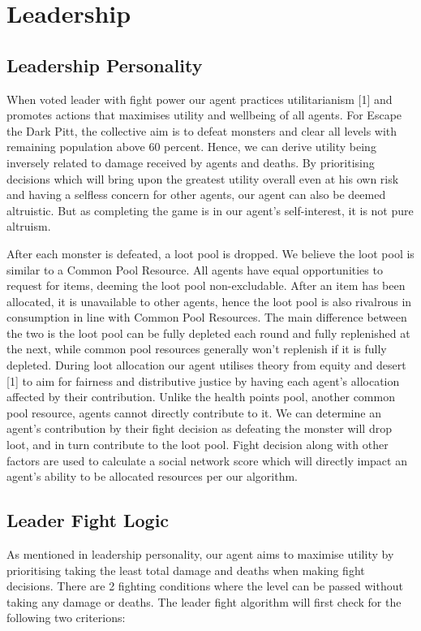 \section{Leadership}
\subsection{Leadership Personality}
When voted leader with fight power our agent practices utilitarianism [1] and promotes actions that maximises utility and wellbeing of all agents. For Escape the Dark Pitt, the collective aim is to defeat monsters and clear all levels with remaining population above 60 percent. Hence, we can derive utility being inversely related to damage received by agents and deaths. By prioritising decisions which will bring upon the greatest utility overall even at his own risk and having a selfless concern for other agents, our agent can also be deemed altruistic. But as completing the game is in our agent's self-interest, it is not pure altruism.

After each monster is defeated, a loot pool is dropped. We believe the loot pool is similar to a Common Pool Resource. All agents have equal opportunities to request for items, deeming the loot pool non-excludable. After an item has been allocated, it is unavailable to other agents, hence the loot pool is also rivalrous in consumption in line with Common Pool Resources. The main difference between the two is the loot pool can be fully depleted each round and fully replenished at the next, while common pool resources generally won't replenish if it is fully depleted. During loot allocation our agent utilises theory from equity and desert [1] to aim for fairness and distributive justice by having each agent's allocation affected by their contribution. Unlike the health points pool, another common pool resource, agents cannot directly contribute to it. We can determine an agent's contribution by their fight decision as defeating the monster will drop loot, and in turn contribute to the loot pool. Fight decision along with other factors are used to calculate a social network score which will directly impact an agent's ability to be allocated resources per our algorithm.

\subsection{Leader Fight Logic}
As mentioned in leadership personality, our agent aims to maximise utility by prioritising taking the least total damage and deaths when making fight decisions. There are 2 fighting conditions where the level can be passed without taking any damage or deaths. The leader fight algorithm will first check for the following two criterions:

